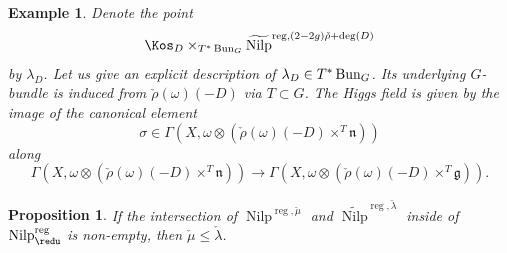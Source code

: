 \documentclass[9pt]{amsart}
\DeclareMathOperator{\reg}{{reg}}
\DeclareMathOperator{\Nilp}{{Nilp}} \DeclareMathOperator{\op}{{op}}
\newtheorem{pr}[subsubsection]{Proposition}
\newtheorem{ex}[subsubsection]{Example}
\numberwithin{equation}{section}
\begin{document}
	

\begin{ex}\label{lambda_D}
	Denote the point $$ \Kos_D \times_{T^* \Bun_G} {\widetilde{\Nilp}}^{\reg, (2-2g)\check{\rho} + \deg(D)}$$ by $\lambda_D$. Let us give an explicit description of $\lambda_D \in T^*\operatorname{{Bun}}_G$. Its underlying $G$-bundle is induced from $\check{\rho}(\omega)(-D)$ via $T \subset G$. The Higgs field is given by the image of the canonical element $$\sigma \in \Gamma(X, \omega \otimes(\check{\rho}(\omega)(-D) \times^T \mathfrak{n}))$$ along $$\Gamma(X, \omega \otimes(\check{\rho}(\omega)(-D)\times^T \mathfrak{n})) \rightarrow \Gamma(X, \omega \otimes(\check{\rho}(\omega)(-D)\times^T \mathfrak{g})).$$
\end{ex}

\begin{pr}\label{nilpintersections}
	If the intersection of ${\Nilp}^{\reg, \check{\mu}}$ and $\widetilde{\Nilp}^{\reg, \check{\lambda}}$ inside of ${\Nilp}^{\reg}_{\redu}$ is non-empty, then $\check{\mu} \leq \check{\lambda}$.
\end{pr}
\end{document}
